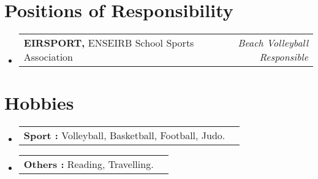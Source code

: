 \documentclass[a4paper,11pt]{article}
\makeatletter
\newcommand{\resumePOR}[3]{
\vspace{0.5mm}\item
    \begin{tabular*}{0.97\textwidth}[t]{l@{\extracolsep{\fill}}r}
        \textbf{#1}\hspace{0.3mm}#2 & \textit{\small{#3}} 
    \end{tabular*}
    \vspace{-2mm}
}
\newcommand{\resumeSubHeadingListStart}{\begin{itemize}[leftmargin=*,labelsep=0mm]}
\newcommand{\resumeSubHeadingListEnd}{\end{itemize}\vspace{2mm}}
\makeatother
\begin{document}
\section{\textbf{Positions of Responsibility}}
\vspace{-0.4mm}
\resumeSubHeadingListStart
\vspace{1.5mm}
\resumePOR{ EIRSPORT, } %
    {ENSEIRB School Sports Association} %
    {Beach Volleyball Responsible} %

\resumeSubHeadingListEnd
\vspace{-4.5mm}




\section{\textbf{Hobbies}}
\vspace{-0.4mm}
\resumeSubHeadingListStart
\vspace{1.5mm}
\resumePOR{ Sport : } %
    {Volleyball, Basketball, Football, Judo.} %
    {}
\resumePOR{ Others : } %
    {Reading, Travelling.} %
    {}
\resumeSubHeadingListEnd
\vspace{-5mm}



\end{document}

